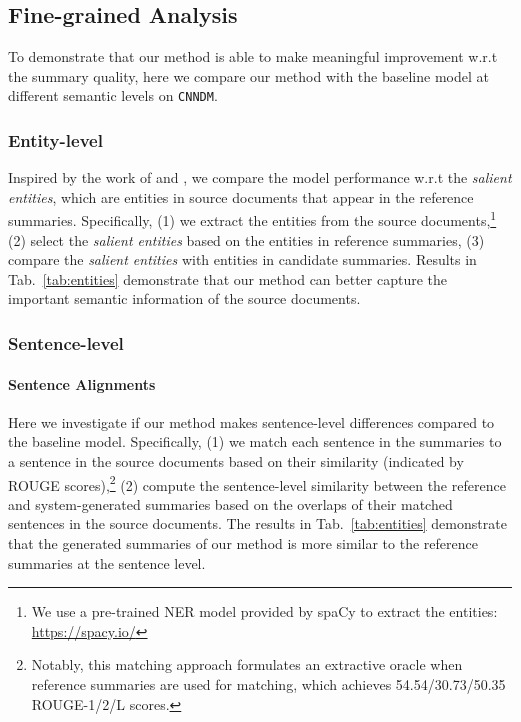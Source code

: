 \documentclass[11pt,a4paper]{article}
\begin{document}
\subsection{Fine-grained Analysis}
To demonstrate that our method is able to make meaningful improvement w.r.t the summary quality, here we compare our method with the baseline model at different semantic levels on \texttt{CNNDM}.

\subsubsection{Entity-level}
Inspired by the work of \citet{gekhman-etal-2020-kobe} and \citet{jain-etal-2020-scirex}, we compare the model performance w.r.t the \textit{salient entities}, which are entities in source documents that appear in the reference summaries.
Specifically, (1) we extract the entities from the source documents,\footnote{We use a pre-trained NER model provided by spaCy to extract the entities: \url{https://spacy.io/}} (2) select the \textit{salient entities} based on the entities in reference summaries, (3) compare the \textit{salient entities} with entities in candidate summaries.
Results in Tab.~\ref{tab:entities} demonstrate that our method can better capture the important semantic information of the source documents.

\subsubsection{Sentence-level} 
\paragraph{Sentence Alignments}
Here we investigate if our method makes sentence-level differences compared to the baseline model.
Specifically, (1) we match each sentence in the summaries to a sentence in the source documents based on their similarity (indicated by ROUGE scores),\footnote{Notably, this matching approach formulates an extractive oracle when reference summaries are used for matching, which achieves 54.54/30.73/50.35 ROUGE-1/2/L scores.} (2) compute the sentence-level similarity between the reference and system-generated summaries based on the overlaps of their matched sentences in the source documents.
The results in Tab.~\ref{tab:entities} demonstrate that the generated summaries of our method is more similar to the reference summaries at the sentence level.

\end{document}
